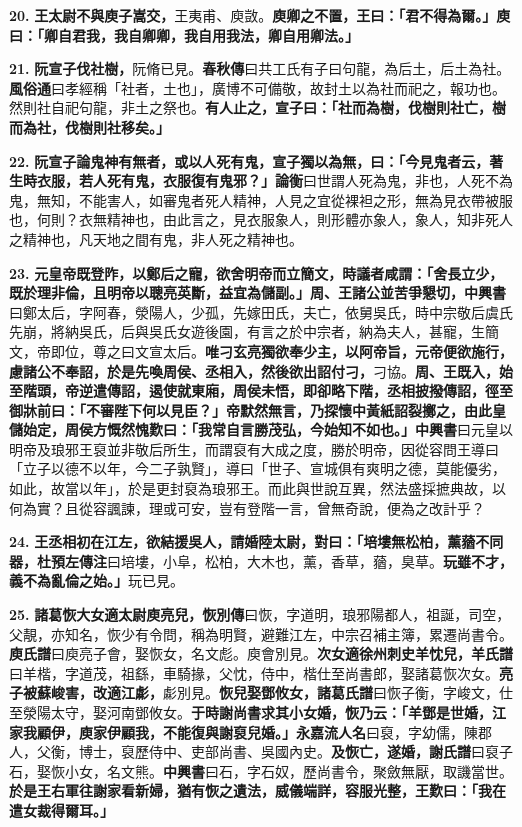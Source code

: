 \textbf{20.} \textbf{王太尉不與庾子嵩交，}{\footnotesize 王夷甫、庾敳。}\textbf{庾卿之不置，王曰：「君不得為爾。」庾曰：「卿自君我，我自卿卿，我自用我法，卿自用卿法。」}

\textbf{21.} \textbf{阮宣子伐社樹，}{\footnotesize 阮脩已見。\textbf{春秋傳}曰共工氏有子曰句龍，為后土，后土為社。\textbf{風俗通}曰孝經稱「社者，土也」，廣博不可備敬，故封土以為社而祀之，報功也。然則社自祀句龍，非土之祭也。}\textbf{有人止之，宣子曰：「社而為樹，伐樹則社亡，樹而為社，伐樹則社移矣。」}

\textbf{22.} \textbf{阮宣子論鬼神有無者，或以人死有鬼，宣子獨以為無，曰：「今見鬼者云，著生時衣服，若人死有鬼，衣服復有鬼邪？」}{\footnotesize \textbf{論衡}曰世謂人死為鬼，非也，人死不為鬼，無知，不能害人，如審鬼者死人精神，人見之宜從裸袒之形，無為見衣帶被服也，何則？衣無精神也，由此言之，見衣服象人，則形體亦象人，象人，知非死人之精神也，凡天地之間有鬼，非人死之精神也。}

\textbf{23.} \textbf{元皇帝既登阼，以鄭后之寵，欲舍明帝而立簡文，時議者咸謂：「舍長立少，既於理非倫，且明帝以聰亮英斷，益宜為儲副。」周、王諸公並苦爭懇切，}{\footnotesize \textbf{中興書}曰鄭太后，字阿春，滎陽人，少孤，先嫁田氏，夫亡，依舅吳氏，時中宗敬后虞氏先崩，將納吳氏，后與吳氏女遊後園，有言之於中宗者，納為夫人，甚寵，生簡文，帝即位，尊之曰文宣太后。}\textbf{唯刁玄亮獨欲奉少主，以阿帝旨，元帝便欲施行，慮諸公不奉詔，於是先喚周侯、丞相入，然後欲出詔付刁，}{\footnotesize 刁協。}\textbf{周、王既入，始至階頭，帝逆遣傳詔，遏使就東廂，周侯未悟，即卻略下階，丞相披撥傳詔，徑至御牀前曰：「不審陛下何以見臣？」帝默然無言，乃探懷中黃紙詔裂擲之，由此皇儲始定，周侯方慨然愧歎曰：「我常自言勝茂弘，今始知不如也。」}{\footnotesize \textbf{中興書}曰元皇以明帝及琅邪王裒並非敬后所生，而謂裒有大成之度，勝於明帝，因從容問王導曰「立子以德不以年，今二子孰賢」，導曰「世子、宣城俱有爽明之德，莫能優劣，如此，故當以年」，於是更封裒為琅邪王。而此與世說互異，然法盛採摭典故，以何為實？且從容諷諫，理或可安，豈有登階一言，曾無奇說，便為之改計乎？}

\textbf{24.} \textbf{王丞相初在江左，欲結援吳人，請婚陸太尉，對曰：「培塿無松柏，薰蕕不同器，}{\footnotesize \textbf{杜預左傳注}曰培塿，小阜，松柏，大木也，薰，香草，蕕，臭草。}\textbf{玩雖不才，義不為亂倫之始。」}{\footnotesize 玩已見。}

\textbf{25.} \textbf{諸葛恢大女適太尉庾亮兒，}{\footnotesize \textbf{恢別傳}曰恢，字道明，琅邪陽都人，祖誕，司空，父靚，亦知名，恢少有令問，稱為明賢，避難江左，中宗召補主簿，累遷尚書令。\textbf{庾氏譜}曰庾亮子會，娶恢女，名文彪。庾會別見。}\textbf{次女適徐州刺史羊忱兒，}{\footnotesize \textbf{羊氏譜}曰羊楷，字道茂，祖繇，車騎掾，父忱，侍中，楷仕至尚書郎，娶諸葛恢次女。}\textbf{亮子被蘇峻害，改適江虨，}{\footnotesize 虨別見。}\textbf{恢兒娶鄧攸女，}{\footnotesize \textbf{諸葛氏譜}曰恢子衡，字峻文，仕至滎陽太守，娶河南鄧攸女。}\textbf{于時謝尚書求其小女婚，恢乃云：「羊鄧是世婚，江家我顧伊，庾家伊顧我，不能復與謝裒兒婚。」}{\footnotesize \textbf{永嘉流人名}曰裒，字幼儒，陳郡人，父衡，博士，裒歷侍中、吏部尚書、吳國內史。}\textbf{及恢亡，遂婚，}{\footnotesize \textbf{謝氏譜}曰裒子石，娶恢小女，名文熊。\textbf{中興書}曰石，字石奴，歷尚書令，聚斂無厭，取譏當世。}\textbf{於是王右軍往謝家看新婦，猶有恢之遺法，威儀端詳，容服光整，王歎曰：「我在遣女裁得爾耳。」}

